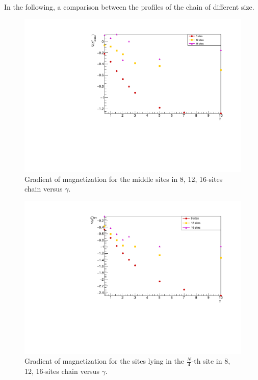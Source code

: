 In the following, a comparison between the profiles of the chain of different size.

\begin{figure}[H]
    \centering
    \includegraphics[scale=0.7]{Figures/gradLMvsGammavsSize.pdf}
    \caption{Gradient of magnetization for the middle sites in 8, 12, 16-sites chain versus $\gamma$.}
    \label{fig:gradLMvsGammavsSize}
\end{figure}

\begin{figure}[H]
    \centering
    \includegraphics[scale=0.7]{Figures/gradLMvsGammavsSize_firstQuarterChain.pdf}
    \caption{Gradient of magnetization for the sites lying in the $\frac{N}{4}$-th site in 8, 12, 16-sites chain versus $\gamma$.}
    \label{fig:gradLMvsGammavsSize_firstQuarterChain}
\end{figure}



